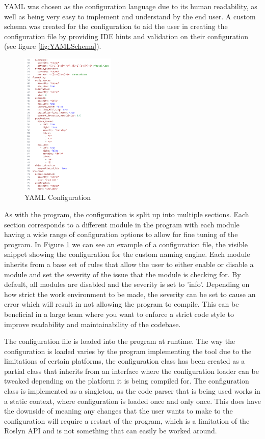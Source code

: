 YAML was chosen as the configuration language due to its human readability, as well as being very easy to implement and understand by the end user. A custom schema was created for the configuration to aid the user in creating the configuration file by providing IDE hints and validation on their configuration (see figure \ref{fig:YAMLSchema}).

\begin{figure}
    \centering
    \caption{YAML Configuration}
    \label{fig:YAMLConfiguration}
    \includegraphics[width=0.4\textwidth]{Figures/YAMLConfigurationCropped.png}
\end{figure}

As with the program, the configuration is split up into multiple sections. Each section corresponds to a different module in the program with each module having a wide range of configuration options to allow for fine tuning of the program. In Figure \ref{fig:YAMLConfiguration} we can see an example of a configuration file, the visible snippet showing the configuration for the custom naming engine. Each module inherits from a base set of rules that allow the user to either enable or disable a module and set the severity of the issue that the module is checking for. By default, all modules are disabled and the severity is set to 'info'. Depending on how strict the work environment to be made, the severity can be set to cause an error which will result in not allowing the program to compile. This can be beneficial in a large team where you want to enforce a strict code style to improve readability and maintainability of the codebase.

The configuration file is loaded into the program at runtime. The way the configuration is loaded varies by the program implementing the tool due to the limitations of certain platforms, the configuration class has been created as a partial class that inherits from an interface where the configuration loader can be tweaked depending on the platform it is being compiled for. The configuration class is implemented as a singleton, as the code parser that is being used works in a static context, where configuration is loaded once and only once. This does have the downside of meaning any changes that the user wants to make to the configuration will require a restart of the program, which is a limitation of the Roslyn API and is not something that can easily be worked around.

